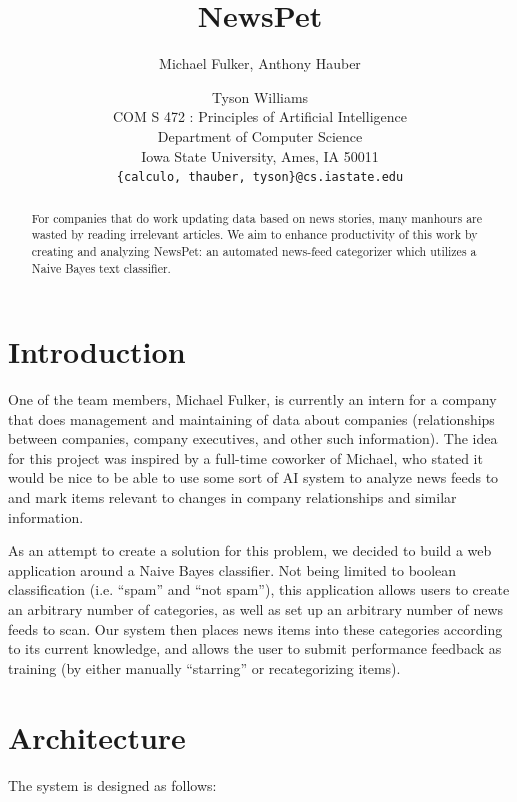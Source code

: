 \documentclass[letterpaper]{article}
\title{NewsPet}
\author{Michael Fulker, Anthony Hauber \and Tyson Williams \\
COM S 472 : Principles of Artificial Intelligence\\Department of Computer Science\\ Iowa State University, Ames, IA 50011\\
\texttt{\{calculo, thauber, tyson\}@cs.iastate.edu}}
\begin{document}
\nocopyright%
\maketitle

\begin{abstract}
For companies that do work updating data based on news stories, many manhours are wasted by reading irrelevant articles.
We aim to enhance productivity of this work by creating and analyzing NewsPet: an automated news-feed categorizer which utilizes a Naive Bayes text classifier.
\end{abstract}


\section{Introduction}
One of the team members, Michael Fulker, is currently an intern for a company that does management and maintaining of data about companies (relationships between companies, company executives, and other such information).
The idea for this project was inspired by a full-time coworker of Michael, who stated it would be nice to be able to use some sort of AI system to analyze news feeds to and mark items relevant to changes in company relationships and similar information.

As an attempt to create a solution for this problem, we decided to build a web application around a Naive Bayes classifier. Not being limited to boolean classification (i.e. ``spam'' and ``not spam''), this application allows users to create an arbitrary number of categories, as well as set up an arbitrary number of news feeds to scan. Our system then places news items into these categories according to its current knowledge, and allows the user to submit performance feedback as training (by either manually ``starring'' or recategorizing items).

\pagebreak
\section{Architecture}
The system is designed as follows:
\end{document}
